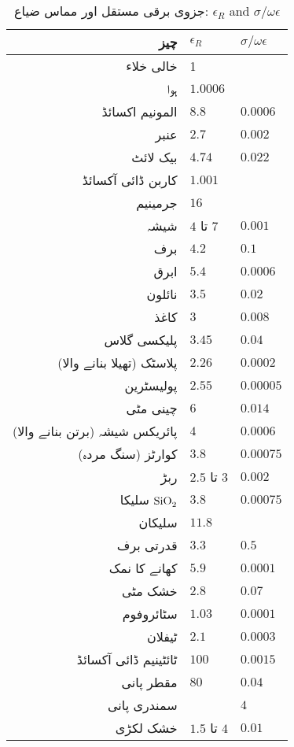 {\renewcommand{\arraystretch}{1.2}
\begin{table}
\caption*{جزوی برقی مستقل اور مماس ضیاع: $\epsilon_R$ and $\sigma/\omega \epsilon$}
\centering
\begin{tabular}{r | l | l}
\hline
چیز & $\epsilon_R$ & $\sigma/\omega \epsilon$\\
\hline
خالی خلاء & 1 &  \\
ہوا&  $\num{1.0006}$&  \\
المونیم اکسائڈ  & $\num{8.8}$ & $\num{0.0006}$\\
عنبر  & $\num{2.7}$& $\num{0.002}$ \\
بیک لائٹ  & $\num{4.74}$& $\num{0.022}$ \\
کاربن ڈائی آکسائڈ &$\num{1.001}$&\\
جرمینیم&$\num{16}$&\\
شیشہ & $4$ تا $7$ & $\num{0.001}$\\
برف & $\num{4.2}$& $\num{0.1}$ \\
ابرق   & $\num{5.4}$ & $\num{0.0006}$\\
نائلون  & $\num{3.5}$ & $\num{0.02}$\\
کاغذ  & $\num{3}$ & $\num{0.008}$\\
پلیکسی گلاس  & $\num{3.45}$ & $\num{0.04}$\\
پلاسٹک (تھیلا بنانے والا)   & $\num{2.26}$ & $\num{0.0002}$ \\
پولیسٹرین & $\num{2.55}$ & $\num{0.00005}$ \\
چینی مٹی & $\num{6}$ & $\num{0.014}$ \\
پائریکس شیشہ (برتن بنانے والا)  & $\num{4}$& $\num{0.0006}$ \\
کوارٹز (سنگ مردہ)  & $\num{3.8}$ & $\num{0.00075}$ \\
ربڑ & $2.5$ تا $3$ & $\num{0.002}$\\
سلیکا  $\ce{SiO2}$ & $\num{3.8}$ & $\num{0.00075}$ \\
سلیکان& $\num{11.8}$ &  \\
قدرتی برف& $\num{3.3}$ & $\num{0.5}$ \\
کھانے کا نمک& $\num{5.9}$ & $\num{0.0001}$ \\
خشک مٹی& $\num{2.8}$ & $\num{0.07}$ \\
سٹائروفوم  & $\num{1.03}$ & $\num{0.0001}$ \\
ٹیفلان & $\num{2.1}$ & $\num{0.0003}$ \\
ٹائٹینیم ڈائی آکسائڈ & $\num{100}$ & $\num{0.0015}$ \\
مقطر پانی & $\num{80}$ & $\num{0.04}$ \\
سمندری پانی&  & $\num{4}$ \\
خشک لکڑی&$1.5$ تا $4$ & $\num{0.01}$ \\
\end{tabular}
\label{جدول_جدول_جزوی_برقی_مستقل_زاویہ_ضیاع}
\end{table}
}

